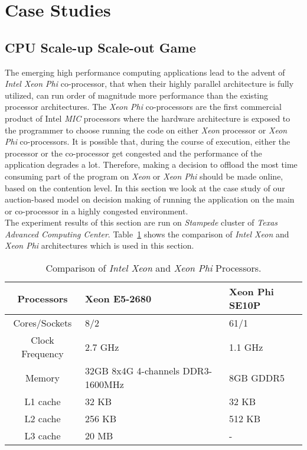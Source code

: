 \section{Case Studies} \label{Case_Studies}
\subsection{CPU Scale-up Scale-out Game}
The emerging high performance computing applications lead to the advent of \textit{Intel Xeon Phi} co-processor, that when their highly parallel architecture is fully utilized, can run order of magnitude more performance than the existing processor architectures. The \textit{Xeon Phi} co-processors are the first commercial product of Intel \textit{MIC} processors where the hardware architecture is exposed to the programmer to choose running the code on either \textit{Xeon} processor or \textit{Xeon Phi} co-processors. It is possible that, during the course of execution, either the processor or the co-processor get congested and the performance of the application degrades a lot. Therefore, making a decision to offload the most time consuming part of the program on \textit{Xeon} or \textit{Xeon Phi} should be made online, based on the contention level.  In this section we look at the case study of our auction-based model on decision making of running the application on the main or co-processor in a highly congested environment. \\
\indent The experiment results of this section are run on \textit{Stampede} cluster of \textit{Texas Advanced Computing Center}. Table~\ref{Table:Xeon} shows the comparison of \textit{Intel Xeon} and \textit{Xeon Phi} architectures which is used in this section. 
\begin{table}[!tb] 
\centering
\caption{Comparison of \textit{Intel Xeon} and \textit{Xeon Phi} Processors.}\label{Table:Xeon}
\begin{tabular}{|c||p{0.8in}||p{1in}|} 
\hline Processors & Xeon E5-2680 & Xeon Phi SE10P \\
\hline Cores/Sockets & 8/2 & 61/1 \\
\hline Clock Frequency & 2.7 GHz & 1.1 GHz  \\
\hline Memory & 32GB 8x4G 4-channels DDR3-1600MHz & 8GB GDDR5 \\
\hline L1 cache & 32 KB & 32 KB \\
\hline L2 cache & 256 KB & 512 KB \\
\hline L3 cache & 20 MB & - \\
\hline
\end{tabular}
\end{table}
